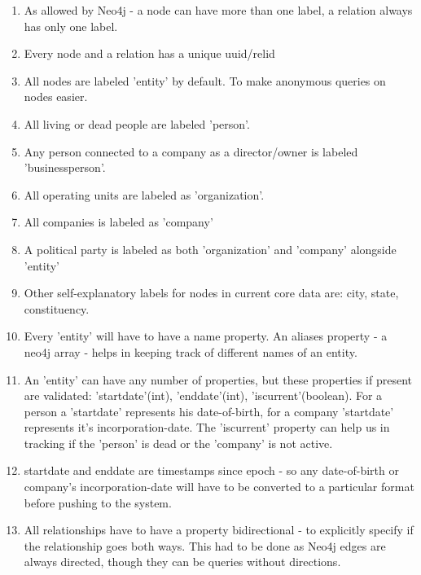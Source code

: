 \begin {enumerate}

\item As allowed by Neo4j - a node can have more than one label, a relation always has only one label.

\item Every node and a relation has a unique uuid/relid

\item All nodes are labeled 'entity' by default. To make anonymous queries on nodes easier.

\item All living or dead people are labeled 'person'.

\item Any person connected to a company as a director/owner is labeled 'businessperson'.

\item All operating units are labeled as 'organization'.

\item All companies is labeled as 'company'

\item A political party is labeled as both 'organization' and 'company' alongside 'entity'

\item Other self-explanatory labels for nodes in current core data are: city, state, constituency.

\item Every 'entity' will have to have a name property. An aliases property - a neo4j array - helps in keeping track of different names of an entity.

\item An 'entity' can have any number of properties, but these properties if present are validated: 'startdate'(int), 'enddate'(int), 'iscurrent'(boolean). For a person a 'startdate' represents his date-of-birth, for a company 'startdate' represents it's incorporation-date. The 'iscurrent' property can help us in tracking if the 'person' is dead or the 'company' is not active.

\item startdate and enddate are timestamps since epoch - so any date-of-birth or company's incorporation-date will have to be converted to a particular format before pushing to the system.

\item All relationships have to have a property bidirectional - to explicitly specify if the relationship goes both ways. This had to be done as Neo4j edges are always directed, though they can be queries without directions.


\end{enumerate}
